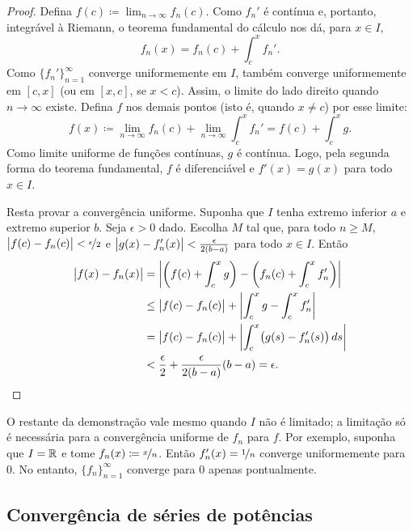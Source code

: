 \begin{proof}
Defina $f(c) \coloneqq \lim_{n\to \infty} f_n(c)$.
Como $f_n'$ é contínua e, portanto, integrável à Riemann, o teorema
fundamental do cálculo nos dá, para $x \in I$,
\begin{equation*}
f_n(x) = f_n(c) + \int_c^x f_n' .
\end{equation*}
Como $\{ f_n' \}_{n=1}^\infty$ converge uniformemente em $I$, também
converge uniformemente em $[c,x]$ (ou em $[x,c]$, se $x < c$).
Assim, o limite do lado direito quando $n \to \infty$ existe.
Defina $f$ nos demais pontos (isto é, quando $x\neq c$) por esse limite:
\begin{equation*}
f(x) \coloneqq
\lim_{n\to\infty} f_n(c) + \lim_{n\to\infty} \int_c^x f_n'
=
f(c) + \int_c^x g .
\end{equation*}
Como limite uniforme de funções contínuas, $g$ é contínua. Logo, pela
segunda forma do teorema fundamental, $f$ é diferenciável e
$f'(x) = g(x)$ para todo $x \in I$.

Resta provar a convergência uniforme.
Suponha que $I$ tenha extremo inferior $a$ e extremo superior $b$.
Seja $\epsilon > 0$ dado. Escolha $M$ tal que, para todo $n \geq M$,
$\bigl\lvert {f(c)-f_n(c)} \bigr\rvert < \nicefrac{\epsilon}{2}$
e
$\bigl\lvert {g(x)-f_n'(x)} \bigr\rvert < \frac{\epsilon}{2(b-a)}$
para todo $x \in I$. Então
\begin{equation*}
\begin{split}
\bigl\lvert {f(x) - f_n(x)} \bigr\rvert & =
\left\lvert {\left(f(c) + \int_c^x g\right) - \left( f_n(c) + \int_c^x f_n' \right)} \right\rvert
\\
& \leq
\bigl\lvert {f(c) - f_n(c)} \bigr\rvert + \left\lvert {\int_c^x g - \int_c^x f_n'} \right\rvert
\\
& =
\bigl\lvert {f(c) - f_n(c)} \bigr\rvert + \left\lvert {\int_c^x \bigl(g(s) - f_n'(s)\bigr) \, ds} \right\rvert
\\
& <
\frac{\epsilon}{2}
+
\frac{\epsilon}{2(b-a)}
(b-a)
=\epsilon. \qedhere
\end{split}
\end{equation*}
\end{proof}

O restante da demonstração vale mesmo quando $I$ não é limitado; a
limitação só é necessária para a convergência uniforme de $f_n$ para $f$.
Por exemplo, suponha que $I = {\mathbb{R}}$ e tome $f_n(x) \coloneqq \nicefrac{x}{n}$.
Então $f_n'(x)=\nicefrac{1}{n}$ converge uniformemente para 0. No entanto,
$\{f_n\}_{n=1}^\infty$ converge para 0 apenas pontualmente.

\subsection{Convergência de séries de potências}

